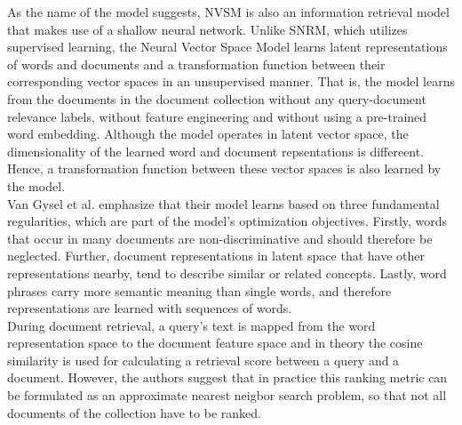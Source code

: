 As the name of the model suggests, NVSM is also an information
    retrieval model that makes use of a shallow neural network.
Unlike SNRM, which utilizes supervised learning, the 
    Neural Vector Space Model learns latent representations
    of words and documents and a
    transformation function between their corresponding 
    vector spaces
    in an unsupervised manner.
That is, the model learns from the documents in the document 
    collection without any query-document relevance labels, 
    without feature engineering and
    without using a pre-trained word embedding.
Although the model operates in latent vector space,
    the dimensionality of the learned word and document
    repsentations is differeent.
Hence, a transformation function between these vector spaces
    is also learned by the model.\\
Van Gysel et al. emphasize that their model learns based on
    three fundamental regularities, which are part of the
    model's optimization objectives.
Firstly, words that occur in many documents are non-discriminative
    and should therefore be neglected.
Further, document representations in latent space that have 
    other representations nearby, tend to describe
    similar or related concepts.
Lastly, word phrases carry more semantic
    meaning than single words, and therefore representations
    are learned with sequences of words.\\
During document retrieval, a query's text is mapped
    from the word representation space to the document feature
    space and in theory the cosine similarity is used 
    for calculating a retrieval score between a query and
    a document.
However, the authors suggest that in practice this ranking 
    metric can be formulated as an approximate nearest neigbor 
    search problem, so that not all documents of the collection
    have to be ranked.






